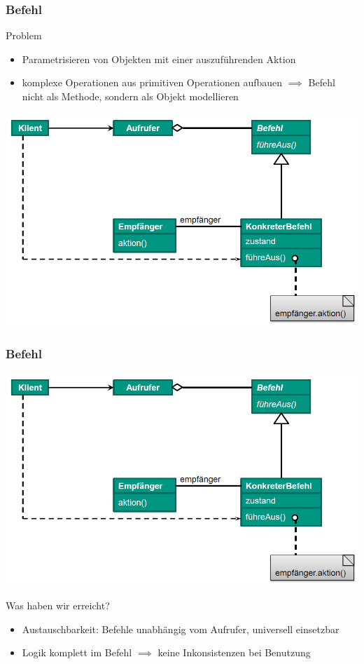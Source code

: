 \documentclass[18pt]{beamer}
\begin{document}
	\begin{frame}
		\frametitle{Befehl}
		\begin{block}{Problem}
			\begin{itemize}
				\item Parametrisieren von Objekten mit einer auszuführenden Aktion \pause 
				\item komplexe Operationen aus primitiven Operationen aufbauen \pause
				\linebreak $\implies$ Befehl nicht als Methode, sondern als Objekt modellieren
			\end{itemize}
		\end{block}
		\pause
		\centering
		\includegraphics[scale=0.33]{./pics/tut4/command.png}
	\end{frame}

	\begin{frame}
		\frametitle{Befehl}
		\includegraphics[scale=0.35]{./pics/tut4/command.png}
		\begin{block}{Was haben wir erreicht?}
			\begin{itemize}
				\item Austauschbarkeit: Befehle unabhängig vom Aufrufer, universell einsetzbar \pause
				\item Logik komplett im Befehl $\implies$ keine Inkonsistenzen bei Benutzung
			\end{itemize}
		\end{block}
	\end{frame}
	
\end{document}
